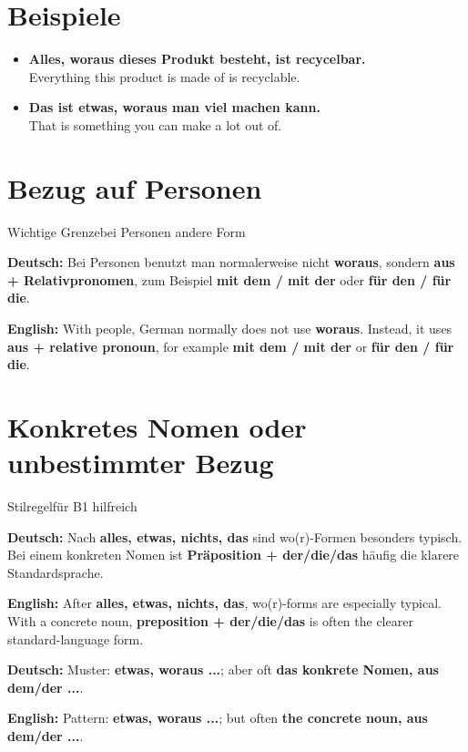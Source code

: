 \documentclass[a4paper,11pt]{article}
\newcommand{\GermanText}[1]{\textbf{Deutsch: }#1\par}
\newcommand{\EnglishText}[1]{{\small\color{SoftGray}\textbf{English: }#1\par}}
\newcommand{\ExampleItem}[2]{\item \textbf{#1}\\{\small\color{SoftGray}#2}}
\begin{document}
\section{Beispiele}

\begin{exbox}

\begin{itemize}

\ExampleItem{Alles, woraus dieses Produkt besteht, ist recycelbar.}{Everything this product is made of is recyclable.}

\ExampleItem{Das ist etwas, woraus man viel machen kann.}{That is something you can make a lot out of.}

\end{itemize}

\end{exbox}

\section{Bezug auf Personen}

\begin{grammarentry}{Wichtige Grenze}{bei Personen andere Form}

\GermanText{Bei Personen benutzt man normalerweise nicht \textbf{woraus}, sondern \textbf{aus + Relativpronomen}, zum Beispiel \textbf{mit dem / mit der} oder \textbf{für den / für die}.}

\EnglishText{With people, German normally does not use \textbf{woraus}. Instead, it uses \textbf{aus + relative pronoun}, for example \textbf{mit dem / mit der} or \textbf{für den / für die}.}

\end{grammarentry}

\section{Konkretes Nomen oder unbestimmter Bezug}

\begin{grammarentry}{Stilregel}{für B1 hilfreich}

\GermanText{Nach \textbf{alles, etwas, nichts, das} sind wo(r)-Formen besonders typisch. Bei einem konkreten Nomen ist \textbf{Präposition + der/die/das} häufig die klarere Standardsprache.}

\EnglishText{After \textbf{alles, etwas, nichts, das}, wo(r)-forms are especially typical. With a concrete noun, \textbf{preposition + der/die/das} is often the clearer standard-language form.}

\GermanText{Muster: \textbf{etwas, woraus ...}; aber oft \textbf{das konkrete Nomen, aus dem/der ...}.}

\EnglishText{Pattern: \textbf{etwas, woraus ...}; but often \textbf{the concrete noun, aus dem/der ...}.}

\end{grammarentry}
\end{document}
